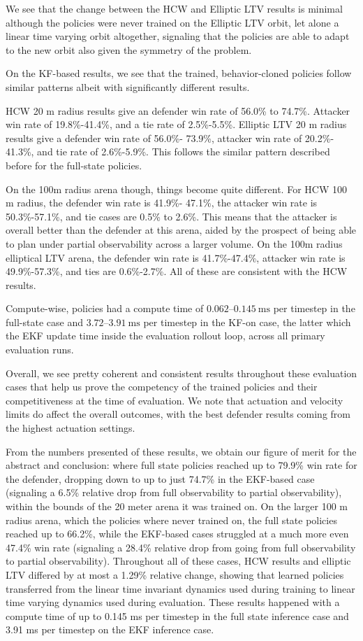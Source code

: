 We see that the change between the HCW and Elliptic LTV results is minimal although the policies were never trained on the Elliptic LTV orbit, let alone a linear time varying orbit altogether, signaling that the policies are able to adapt to the new orbit also given the symmetry of the problem.

On the KF-based results, we see that the trained, behavior-cloned policies follow similar patterns albeit with significantly different results.

HCW 20 m radius results give an defender win rate of 56.0\% to 74.7\%. Attacker win rate of 19.8\%-41.4\%, and a tie rate of 2.5\%-5.5\%. Elliptic LTV 20 m radius results give a defender win rate of 56.0\%- 73.9\%, attacker win rate of 20.2\%- 41.3\%, and tie rate of 2.6\%-5.9\%. This follows the similar pattern described before for the full-state policies. 

On the 100m radius arena though, things become quite different. For HCW 100 m radius, the defender win rate is 41.9\%- 47.1\%, the attacker win rate is  50.3\%-57.1\%, and tie cases are 0.5\% to 2.6\%. This means that the attacker is overall better than the defender at this arena, aided by the prospect of being able to plan under partial observability across a larger volume. On the 100m radius elliptical LTV arena, the defender win rate is 41.7\%-47.4\%, attacker win rate is 49.9\%-57.3\%, and ties are 0.6\%-2.7\%. All of these are consistent with the HCW results.

Compute-wise, policies had a compute time of $0.062$--$0.145~\mathrm{ms}$ per timestep
in the full-state case and $3.72$--$3.91~\mathrm{ms}$ per timestep in the KF-on case, the latter which the EKF update time inside the evaluation rollout loop,
across all primary evaluation runs.

Overall, we see pretty coherent and consistent results throughout these evaluation cases that help us prove the competency of the trained policies and their competitiveness at the time of evaluation. We note that actuation and velocity limits do affect the overall outcomes, with the best defender results coming from the highest actuation settings. 

From the numbers presented of these results, we obtain our figure of merit for the abstract and conclusion: where full state policies reached up to 79.9\% win rate for the defender, dropping down to up to just 74.7\% in the EKF-based case (signaling a 6.5\% relative drop from full observability to partial observability), within the bounds of the 20 meter arena it was trained on. On the larger 100 m radius arena, which the policies where never trained on, the full state policies reached up to 66.2\%, while the EKF-based cases struggled at a much more even 47.4\% win rate (signaling a 28.4\% relative drop from going from full observability to partial observability). Throughout all of these cases, HCW results and elliptic LTV differed by at most a 1.29\% relative change, showing that learned policies transferred from the linear time invariant dynamics used during training to linear time varying dynamics used during evaluation. These results happened with a compute time of up to 0.145 ms per timestep in the full state inference case and 3.91 ms per timestep on the EKF inference case.


